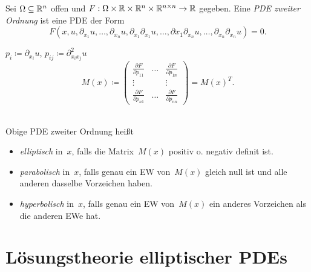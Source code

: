 \documentclass{cheat-sheet}
\begin{document}

\begin{defn}
  Sei $\Omega \subseteq \mathbb{R}^n$ offen und $F : \Omega \times \mathbb{R} \times \mathbb{R}^n \times \mathbb{R}^{n \times n} \to \mathbb{R}$ gegeben.
  Eine \emph{PDE zweiter Ordnung} ist eine PDE der Form
  \[ F(x, u, \partial_{x_1} u, \ldots, \partial_{x_n} u, \partial_{x_1} \partial_{x_1} u, \ldots, \partial{x_1} \partial_{x_n} u, \ldots, \partial_{x_n} \partial_{x_n} u) = 0. \]
\end{defn}

\begin{nota}
  $p_i \coloneqq \partial_{x_i} u$, $p_{ij} \coloneqq \partial^2_{x_i x_j} u$
  \[
    M(x) \coloneqq \begin{pmatrix}
      \tfrac{\partial F}{\partial p_{11}} & \hdots & \tfrac{\partial F}{\partial p_{1n}} \\
      \vdots && \vdots \\
      \tfrac{\partial F}{\partial p_{n1}} & \hdots & \tfrac{\partial F}{\partial p_{nn}}
    \end{pmatrix} = M(x)^{T}.
  \]
\end{nota}

\begin{defn}\mbox{}\\
  Obige PDE zweiter Ordnung heißt
  \begin{itemize}
    \item \emph{elliptisch} in~$x$, falls die Matrix~$M(x)$ positiv o. negativ definit ist.
    \item \emph{parabolisch} in~$x$, falls genau ein EW von~$M(x)$ gleich null ist und alle anderen dasselbe Vorzeichen haben.
    \item \emph{hyperbolisch} in~$x$, falls genau ein EW von~$M(x)$ ein anderes Vorzeichen als die anderen EWe hat.
  \end{itemize}
\end{defn}



\section{Lösungstheorie elliptischer PDEs}
\end{document}

